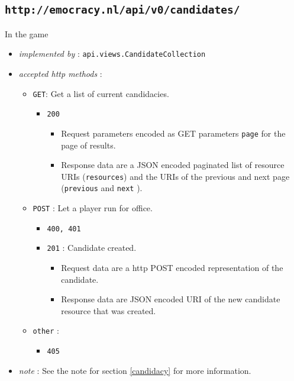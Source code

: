\documentclass[a4paper]{report}
\begin{document}
\subsection{\texttt{http://emocracy.nl/api/v0/candidates/}}
In the game 
\begin{itemize}
    \item{\textsl{implemented by} : \texttt{api.views.CandidateCollection}}
    \item{\textsl{accepted http methods} :
        \begin{itemize}
            \item{\texttt{GET}: Get a list of current candidacies.
                \begin{itemize}
                    \item{\texttt{200} 
                    \begin{itemize}
                        \item{Request parameters encoded as GET parameters 
                        \texttt{page} for the page of results.}
                        \item{Response data are a JSON encoded paginated list of 
                        resource URIs (\texttt{resources}) and the URIs of the 
                        previous and next page (\texttt{previous} and \texttt{next}
                        ).}
                    \end{itemize}
                    }
                \end{itemize}
            }
            \item{\texttt{POST} : Let a player run for office.
                \begin{itemize}
                    \item{\texttt{400, 401}}
                    \item{\texttt{201} : Candidate created.
                    \begin{itemize}
                        \item{Request data are a http POST encoded representation
                        of the candidate.}
                        \item{Response data are JSON encoded URI of the new
                        candidate resource that was created.}
                    \end{itemize}
                    }
                \end{itemize}
            }
            
            \item{\texttt{other} :
                \begin{itemize}
                    \item{\texttt{405}}
                \end{itemize}
            }
        \end{itemize}
    }
    \item{\textsl{note} : See the note for section \ref{candidacy} for more information.}    
\end{itemize}
\end{document}
